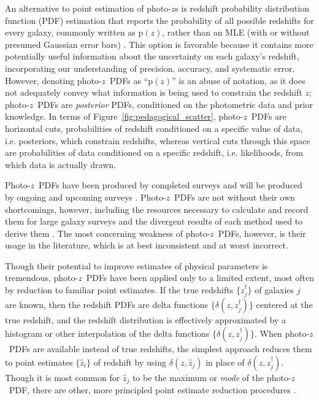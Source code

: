 \documentclass[iop]{emulateapj}
\newcommand{\Fig}[1]{Figure~\ref{#1}}
\newcommand{\pr}[1]{\ensuremath{\mathrm{p}(#1)}}%
\newcommand{\pz}{photo-$z$}
\newcommand{\Pz}{Photo-$z$}
\newcommand{\pzpdf}{\pz\ PDF}%
\newcommand{\Pzpdf}{\Pz\ PDF}%
\begin{document}
An alternative to point estimation of \pz s is redshift probability distribution function (PDF) estimation that reports the probability of all possible redshifts for every galaxy, commonly written as $\pr{z}$, rather than an MLE (with or without presumed Gaussian error bars) \citep{koo_photometric_1999}.  
This option is favorable because it contains more potentially useful information about the uncertainty on each galaxy's redshift, incorporating our understanding of precision, accuracy, and systematic error.
However, denoting \pzpdf s as ``$\pr{z}$'' is an abuse of notation, as it does not adequately convey what information is being used to constrain the redshift $z$; \pzpdf s are \textit{posterior} PDFs, conditioned on the photometric data and prior knowledge.
In terms of \Fig{fig:pedagogical_scatter}, \pzpdf s are horizontal cuts, probabilities of redshift conditioned on a specific value of data, i.e. posteriors, which constrain redshifts, whereas vertical cuts through this space are probabilities of data conditioned on a specific redshift, i.e. likelihoods, from which data is actually drawn.

\Pzpdf s have been produced by completed surveys \citep{hildebrandt_cfhtlens:_2012, sheldon_photometric_2012} and will be produced by ongoing and upcoming surveys \citep{abell_lsst_2009, carrasco_kind_exhausting_2014, bonnett_redshift_2016, masters_mapping_2015}.  
\Pzpdf s are not without their own shortcomings, however, including the resources necessary to calculate and record them for large galaxy surveys \citep{carrasco_kind_sparse_2014, malz_approximating_2018} and the divergent results of each method used to derive them \citep[ and reviewed in Schmidt, Malz \& Soo, et al. (in prep)]{hildebrandt_phat:_2010, dahlen_critical_2013, sanchez_clustering_2013, bonnett_redshift_2016, tanaka_photometric_2018}.  
The most concerning weakness of \pzpdf s, however, is their usage in the literature, which is at best inconsistent and at worst incorrect.  

Though their potential to improve estimates of physical parameters is tremendous, \pzpdf s have been applied only to a limited extent, most often by reduction to familiar point estimates.
If the true redshifts $\{z_{j}^{\dagger}\}$ of galaxies $j$ are known, then the redshift PDFs are delta functions $\{\delta(z, z_{j}^{\dagger})\}$ centered at the true redshift, and the redshift distribution is effectively approximated by a histogram or other interpolation of the delta functions $\{\delta(z, z_{j}^{\dagger})\}$.
When \pzpdf s are available instead of true redshifts, the simplest approach reduces them to point estimates $\{\hat{z}_{i}\}$ of redshift by using $\delta(z, \hat{z}_{j})$ in place of $\delta(z, z_{j}^{\dagger})$.
Though it is most common for $\hat{z}_{j}$ to be the maximum or \textit{mode} of the \pzpdf, there are other, more principled point estimate reduction procedures \citep{tanaka_photometric_2018}.
\end{document}
